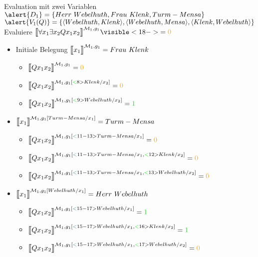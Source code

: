 \ifdefined\HANDOUT
  \begin{frame}
    {Evaluation mit zwei Variablen}
    \onslide<+->
    \onslide<+->\scriptsize
    $\alert{D_1}=\{Herr\ Webelhuth, Frau\ Klenk, Turm-Mensa\}$ \\
    \onslide<+->
    $\alert{V_1(Q)}=\{\tuple{Webelhuth,Klenk},\tuple{Webelhuth,Mensa},\tuple{Klenk,Webelhuth}\}$ \\
    \onslide<+->
    Evaluiere \alert{$\dem{\forall x_1\exists x_2 Qx_1x_2}^{\Model_1,g_1}\visible<18->{=\orongsch{0}}$} \\
    \onslide<+->
    \Zeile
    \begin{minipage}{0.5\textwidth}\begin{itemize}[<+->]
          \item Initiale Belegung $\dem{x_1}^{\Model_1,g_1}=Frau\ Klenk$
            \begin{itemize}[<+->]\scriptsize
              \item $\dem{Qx_1x_2}^{\mMm_1,g_1}=\orongsch{0}$
              \item $\dem{Qx_1x_2}^{\mMm_1,g_1[\gruen<8>{Klenk/x_2}]}=\orongsch{0}$
              \item $\dem{Qx_1x_2}^{\mMm_1,g_1[\gruen<9>{Webelhuth/x_2}]}=\gruen{1}$
            \end{itemize}
          \item $\dem{x_1}^{\Model_1,g_1[Turm-Mensa/x_1]}=Turm-Mensa$
            \begin{itemize}[<+->]\scriptsize
              \item $\dem{Qx_1x_2}^{\mMm_1,g_1[\tuerkis<11-13>{Turm-Mensa/x_1}]}=\orongsch{0}$
              \item $\dem{Qx_1x_2}^{\mMm_1,g_1[\tuerkis<11-13>{Turm-Mensa/x_1},\gruen<12>{Klenk/x_2}]}=\orongsch{0}$
              \item $\dem{Qx_1x_2}^{\mMm_1,g_1[\tuerkis<11-13>{Turm-Mensa/x_1},\gruen<13>{Webelhuth/x_2}]}=\orongsch{0}$ 
            \end{itemize}
          \item $\dem{x_1}^{\Model_1,g_1[Webelhuth/x_1]}=Herr\ Webelhuth$
            \begin{itemize}[<+->]\scriptsize
              \item $\dem{Qx_1x_2}^{\mMm_1,g_1[\tuerkis<15-17>{Webelhuth/x_1}]}=\gruen{1}$
              \item $\dem{Qx_1x_2}^{\mMm_1,g_1[\tuerkis<15-17>{Webelhuth/x_1},\gruen<16>{Klenk/x_2}]}=\gruen{1}$
              \item $\dem{Qx_1x_2}^{\mMm_1,g_1[\tuerkis<15-17>{Webelhuth/x_1},\gruen<17>{Webelhuth/x_2}]}=\orongsch{0}$
            \end{itemize}
      \end{itemize}\end{minipage}  \end{frame}
